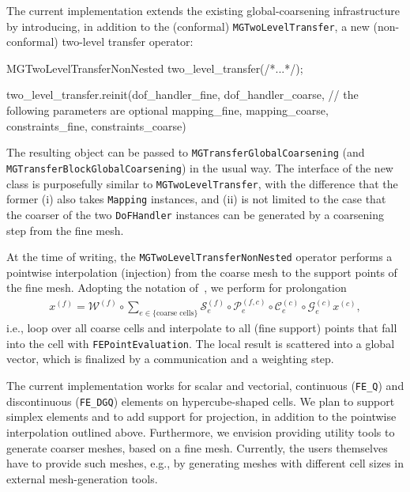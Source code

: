 \documentclass{ansarticle-preprint}
\begin{document}
The current implementation extends the existing global-coarsening infrastructure by
introducing, in addition to the (conformal) \texttt{MGTwoLevelTransfer},
 a new (non-conformal) two-level transfer operator:
\begin{c++}
MGTwoLevelTransferNonNested two_level_transfer(/*...*/);

two_level_transfer.reinit(dof_handler_fine, dof_handler_coarse,
                          // the following parameters are optional
                          mapping_fine, mapping_coarse, 
                          constraints_fine, constraints_coarse)
\end{c++}
The resulting object can be passed to \texttt{MGTransferGlobalCoarsening} (and
\texttt{MGTransferBlockGlobalCoarsening}) in the usual way. The
interface of the new class is purposefully similar to
\texttt{MGTwoLevelTransfer},
with the difference that the former (i) also
takes \texttt{Mapping} instances, and (ii) is not limited to the case
that the coarser of the two \texttt{DoFHandler} instances can be generated by a coarsening step from the fine
mesh.

At the time of writing, the \texttt{MGTwoLevelTransferNonNested} operator performs
a pointwise interpolation (injection) from the coarse mesh to the support points
of the fine mesh. Adopting the notation of~\cite{munch2022gc}, we perform
for prolongation
\begin{align*}
x^{(f)} = \mathcal{W}^{(f)} \circ \sum_{e \in \{\text{coarse cells}\}} \mathcal{S}_e^{(f)} \circ \mathcal{P}_e^{(f, c)}
\circ \mathcal{C}_e^{(c)} \circ \mathcal{G}_e^{(c)} x^{(c)},
\end{align*}
i.e., loop over all coarse cells and interpolate to all (fine support) points that fall
into the cell with \texttt{FEPointEvaluation}. The local result is scattered into a global
vector, which is finalized by a communication and a weighting step.

The current implementation works for scalar and vectorial, continuous (\texttt{FE\_Q})
and discontinuous (\texttt{FE\_DGQ}) elements on hypercube-shaped cells. We plan to support
simplex elements and to add support
for projection, in addition to the pointwise interpolation outlined
above. Furthermore, we envision providing utility tools to generate
coarser 
meshes, based on a fine mesh. Currently, the users themselves 
have to provide such meshes,
e.g., by generating meshes with different cell sizes in external mesh-generation tools.
\end{document}
